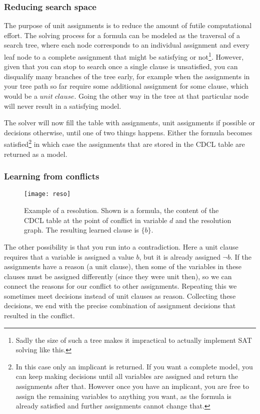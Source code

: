 \subsubsection{Reducing search space}
The purpose of unit assignments is to reduce the amount of futile computational effort. The solving process for a formula can be modeled as the traversal of a search tree, where each node corresponds to an individual assignment and every leaf node to a complete assignment that might be satisfying or not\footnote
{
	Sadly the size of such a tree makes it impractical to actually implement SAT solving like this.
}. However, given that you can stop to search once a single clause is unsatisfied, you can disqualify many branches of the tree early, for example when the assignments in your tree path so far require some additional assignment for some clause, which would be a $unit\; clause$. Going the other way in the tree at that particular node will never result in a satisfying model.

The solver will now fill the table with assignments, unit assignments if possible or decisions otherwise, until one of two things happens. Either the formula becomes satisfied\footnote{
	In this case only an implicant is returned. If you want a complete model, you can keep making decisions until all variables are assigned and return the assignments after that. However once you have an implicant, you are free to assign the remaining variables to anything you want, as the formula is already satisfied and further assignments cannot change that.}
 in which case the assignments that are stored in the CDCL table are returned as a model.


\subsubsection{Learning from conflicts}
\begin{wrapfigure}{r}{8cm}
\texttt{[image: reso]}
\caption{Example of a resolution. Shown is a formula, the content of the CDCL table at the point of conflict in variable $d$ and the resolution graph. The resulting learned clause is $\{b\}$.}
\label{fig:resolution}
\end{wrapfigure}

The other possibility is that you run into a contradiction. Here a unit clause requires that a variable is assigned a value $b$, but it is already assigned $\neg b$. If the assignments have a reason (a unit clause), then some of the variables in these clauses must be assigned differently (since they were unit then), so we can connect the reasons for our conflict to other assignments. Repeating this we sometimes meet decisions instead of unit clauses as reason. Collecting these decisions, we end with the precise combination of assignment decisions that resulted in the conflict. 


